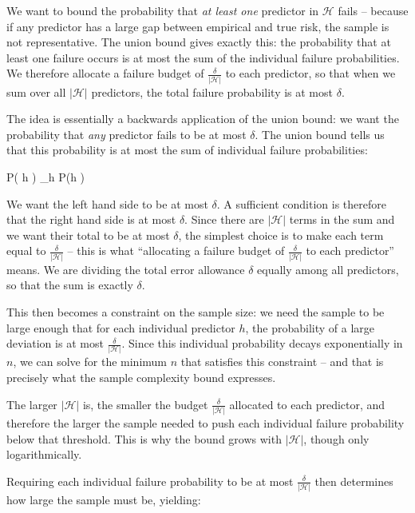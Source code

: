 We want to bound the probability that \emph{at least one} predictor in $\mathcal{H}$ fails -- because if any predictor has a large gap between empirical and true risk, the sample is not representative. The union bound gives exactly this: the probability that at least one failure occurs is at most the sum of the individual failure probabilities. We therefore allocate a failure budget of $\frac{\delta}{|\mathcal{H}|}$ to each predictor, so that when we sum over all $|\mathcal{H}|$ predictors, the total failure probability is at most $\delta$. 

The idea is essentially a backwards application of the union bound: we want the probability that \emph{any} predictor fails to be at most $\delta$. The union bound tells us that this probability is at most the sum of individual failure probabilities:
\begin{myequation}
P( h ) \leq \sum_{h \in {}} P(h )
\end{myequation}
We want the left hand side to be at most $\delta$. A sufficient condition is therefore that the right hand side is at most $\delta$. Since there are $|\mathcal{H}|$ terms in the sum and we want their total to be at most $\delta$, the simplest choice is to make each term equal to $\frac{\delta}{|\mathcal{H}|}$ -- this is what ``allocating a failure budget of $\frac{\delta}{|\mathcal{H}|}$ to each predictor'' means. We are dividing the total error allowance $\delta$ equally among all predictors, so that the sum is exactly $\delta$.

This then becomes a constraint on the sample size: we need the sample to be large enough that for each individual predictor $h$, the probability of a large deviation is at most $\frac{\delta}{|\mathcal{H}|}$. Since this individual probability decays exponentially in $n$, we can solve for the minimum $n$ that satisfies this constraint -- and that is precisely what the sample complexity bound expresses.

The larger $|\mathcal{H}|$ is, the smaller the budget $\frac{\delta}{|\mathcal{H}|}$ allocated to each predictor, and therefore the larger the sample needed to push each individual failure probability below that threshold. This is why the bound grows with $|\mathcal{H}|$, though only logarithmically.



Requiring each individual failure probability to be at most $\frac{\delta}{|\mathcal{H}|}$ then determines how large the sample must be, yielding:

